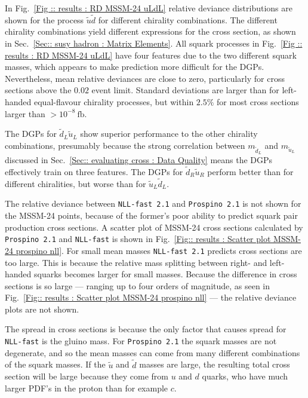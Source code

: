 \documentclass[twoside,english]{uiofysmaster}
\begin{document}
{{In Fig.~\ref{Fig :: results : RD MSSM-24 uLdL}  relative deviance distributions are shown for the process $\widetilde{u} \widetilde{d}$ for different chirality combinations. The different chirality combinations yield different expressions for the cross section, as shown in Sec.~\ref{Sec:: susy hadron : Matrix Elements}. All squark processes in Fig.~\ref{Fig :: results : RD MSSM-24 uLdL} have four features due to the two different squark masses, which appears to make prediction more difficult for the DGPs. Nevertheless, mean relative deviances are close to zero, particularly for cross sections above the $0.02$ event limit. Standard deviations are larger than for left-handed equal-flavour chirality processes, but within $2.5\%$ for most cross sections larger than $> 10^{-8}~\mathrm{fb}$.



The DGPs for $\widetilde{d}_L \widetilde{u}_L$ show superior performance to the other chirality combinations, presumably because the strong correlation between $m_{\widetilde{d}_L}$ and $m_{\widetilde{u}_L}$ discussed in Sec.~\ref{Sec:: evaluating cross : Data Quality} means the DGPs effectively train on three features. The DGPs for $\widetilde{d}_R \widetilde{u}_R$ perform better than for different chiralities, but worse than for $\widetilde{u}_L\widetilde{d}_L$.

The relative deviance between \verb|NLL-fast 2.1| and \verb|Prospino 2.1| is not shown for the MSSM-24 points, because of the former's poor ability to predict squark pair production cross sections. A scatter plot of MSSM-24 cross sections calculated by \verb|Prospino 2.1| and \verb|NLL-fast| is shown in Fig.~\ref{Fig:: results : Scatter plot MSSM-24 prospino nll}. For small mean masses \verb|NLL-fast 2.1| predicts cross sections are too large. This is because the relative mass splitting between right- and left-handed squarks becomes larger for small masses. Because the difference in cross sections is so large --- ranging up to four orders of magnitude, as seen in Fig.~\ref{Fig:: results : Scatter plot MSSM-24 prospino nll} --- the relative deviance plots are not shown.

The spread in cross sections is because the only factor that causes spread for \verb|NLL-fast| is the gluino mass. For \verb|Prospino 2.1| the squark masses are not degenerate, and so the mean masses can come from many different combinations of the squark masses. If the $\tilde{u}$ and $\tilde{d}$ masses are large, the resulting total cross section will be large because they come from $u$ and $d$ quarks, who have much larger PDF's in the proton than for example $c$. 

}}
\end{document}
